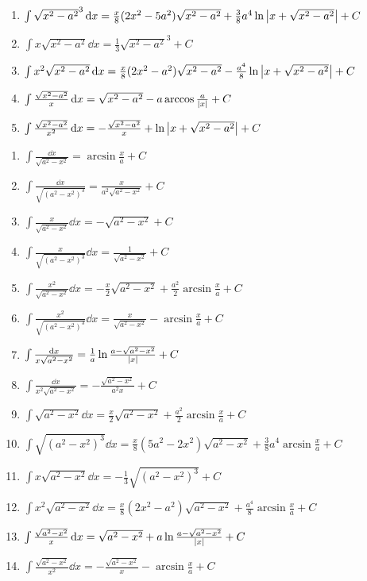 \begin{enumerate}
\item \(\int \sqrt{x^2-a^2}^3 \dd{x} = \frac{x}{8} (2x^2-5a^2) \sqrt{x^2-a^2} + \frac{3}{8} a^4 \ln\abs{x+\sqrt{x^2-a^2}} + C\)

\item \(\int x\sqrt{x^2-a^2} \dd{x} = \frac{1}{3} \sqrt{x^2-a^2}^3 + C\)

\item \(\int x^2 \sqrt{x^2-a^2} \dd{x} = \frac{x}{8} (2x^2-a^2) \sqrt{x^2-a^2} - \frac{a^4}{8} \ln\abs{x+\sqrt{x^2-a^2}} + C\)

\item \(\int \frac{\sqrt{x^2-a^2}}{x} \dd{x} = \sqrt{x^2-a^2} - a \arccos\frac{a}{\abs{x}} + C\)

\item \(\int \frac{\sqrt{x^2-a^2}}{x^2} \dd{x} = -\frac{\sqrt{x^2-a^2}}{x} + \ln\abs{x+\sqrt{x^2-a^2}} + C\)
\end{enumerate}

\begin{enumerate}
\item \(\int \frac{\dd{x}}{\sqrt{a^2-x^2}} = \arcsin\frac{x}{a} + C\)
\item \(\int \frac{\dd{x}}{\sqrt{(a^2-x^2)^3}} = \frac{x}{a^2 \sqrt{a^2-x^2}} + C\)
\item \(\int \frac{x}{\sqrt{a^2-x^2}} \dd{x} = -\sqrt{a^2-x^2} + C\)
\item \(\int \frac{x}{\sqrt{(a^2-x^2)^3}} \dd{x} = \frac{1}{\sqrt{a^2-x^2}} + C\)
\item \(\int \frac{x^2}{\sqrt{a^2-x^2}} \dd{x} = -\frac{x}{2} \sqrt{a^2-x^2} + \frac{a^2}{2} \arcsin\frac{x}{a} + C\)
\item \(\int \frac{x^2}{\sqrt{(a^2-x^2)^3}} \dd{x} = \frac{x}{\sqrt{a^2-x^2}} - \arcsin\frac{x}{a} + C\)
\item \(\int \frac{\dd{x}}{x \sqrt{a^2-x^2}} = \frac{1}{a} \ln\frac{a-\sqrt{a^2-x^2}}{\abs{x}} + C\)
\item \(\int \frac{\dd{x}}{x^2 \sqrt{a^2-x^2}} = -\frac{\sqrt{a^2-x^2}}{a^2 x} + C\)
\item \(\int \sqrt{a^2-x^2} \dd{x} = \frac{x}{2} \sqrt{a^2-x^2} + \frac{a^2}{2} \arcsin\frac{x}{a} + C\)
\item \(\int \sqrt{(a^2-x^2)^3} \dd{x} = \frac{x}{8} (5a^2 - 2x^2) \sqrt{a^2-x^2} + \frac{3}{8} a^4 \arcsin\frac{x}{a} + C\)
\item \(\int x \sqrt{a^2-x^2} \dd{x} = -\frac{1}{3} \sqrt{(a^2-x^2)^3} + C\)
\item \(\int x^2 \sqrt{a^2-x^2} \dd{x} = \frac{x}{8} (2x^2 - a^2) \sqrt{a^2-x^2} + \frac{a^4}{8} \arcsin\frac{x}{a} + C\)
\item \(\int \frac{\sqrt{a^2-x^2}}{x} \dd{x} = \sqrt{a^2-x^2} + a \ln\frac{a-\sqrt{a^2-x^2}}{\abs{x}} + C\)
\item \(\int \frac{\sqrt{a^2-x^2}}{x^2} \dd{x} = -\frac{\sqrt{a^2-x^2}}{x} - \arcsin\frac{x}{a} + C\)
\end{enumerate}

